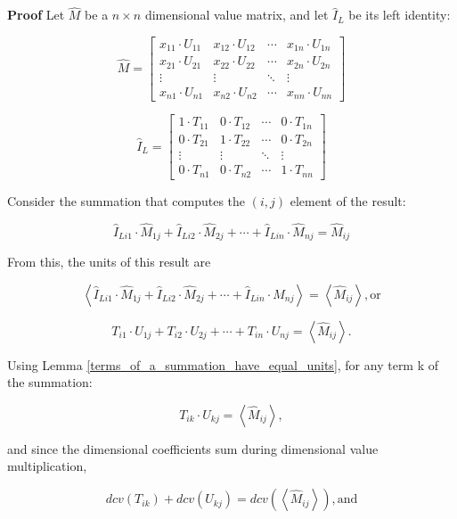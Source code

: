 \documentclass[10pt,letterpaper]{article}
\newenvironment{proof}{\noindent\textbf{Proof} }{\qed \newline}
\newcommand{\qed}{\nobreak \ifvmode \relax \else
      \ifdim\lastskip<1.5em \hskip-\lastskip
      \hskip1.5em plus0em minus0.5em \fi \nobreak
      \vrule height0.75em width0.5em depth0.25em\fi}
\numberwithin{equation}{section}
\begin{document}
\begin{proof}
Let $\hat M$ be a $n \times n$ dimensional value matrix, and let $\hat I_L$ be its left identity:

\[ \hat M = \left[ \begin{matrix} 
  x_{11} \cdot U_{11} & x_{12} \cdot U_{12} & \cdots & x_{1n} \cdot U_{1n} \\
  x_{21} \cdot U_{21} & x_{22} \cdot U_{22} & \cdots & x_{2n} \cdot U_{2n} \\
  \vdots & \vdots & \ddots & \vdots \\
  x_{n1} \cdot U_{n1} & x_{n2} \cdot U_{n2} & \cdots & x_{nn} \cdot U_{nn}
 \end{matrix} \right] \]

\[ \hat I_L = \left[ \begin{matrix} 
  1 \cdot T_{11} & 0 \cdot T_{12} & \cdots & 0 \cdot T_{1n} \\
  0 \cdot T_{21} & 1 \cdot T_{22} & \cdots & 0 \cdot T_{2n} \\
  \vdots & \vdots & \ddots & \vdots \\
  0 \cdot T_{n1} & 0 \cdot T_{n2} & \cdots & 1 \cdot T_{nn}
 \end{matrix} \right] \]

Consider the summation that computes the $(i, j)$ element of the result:

\[ \hat I_{Li1} \cdot \hat M_{1j} + \hat I_{Li2} \cdot \hat M_{2j} + \cdots + \hat I_{Lin} \cdot \hat M_{nj} = \hat M_{ij} \]

From this, the units of this result are

\[ \left\langle \hat I_{Li1} \cdot \hat M_{1j} + \hat I_{Li2} \cdot \hat M_{2j} + \cdots + \hat I_{Lin} \cdot \hat M_{nj} \right\rangle = \left\langle \hat M_{ij} \right\rangle , \mbox{or} \]

\[ T_{i1} \cdot U_{1j} + T_{i2} \cdot U_{2j} + \cdots + T_{in} \cdot U_{nj} = \left\langle \hat M_{ij} \right\rangle . \]

Using Lemma \ref{terms_of_a_summation_have_equal_units}, for any term k of the summation:

\[ T_{ik} \cdot U_{kj} = \left\langle \hat M_{ij} \right\rangle , \]

and since the dimensional coefficients sum during dimensional value multiplication,

\begin{equation} \label{basic_equation_1_for_left_identity_ddv_proof} dcv(T_{ik}) + dcv(U_{kj}) = dcv( \left\langle \hat M_{ij} \right\rangle ) , \mbox{and} \end{equation}


\end{proof}
\end{document}
